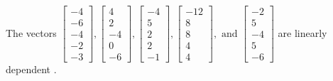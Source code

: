 \begin{exercise}
\begin{exerciseStatement}
  \end{exerciseStatement}
  \begin{exerciseAnswer}
   The vectors \(\left[\begin{array}{r}
-4 \\
-6 \\
-4 \\
-2 \\
-3
\end{array}\right] , \left[\begin{array}{r}
4 \\
2 \\
-4 \\
0 \\
-6
\end{array}\right] , \left[\begin{array}{r}
-4 \\
5 \\
2 \\
2 \\
-1
\end{array}\right] , \left[\begin{array}{r}
-12 \\
8 \\
8 \\
4 \\
4
\end{array}\right] , \text{ and } \left[\begin{array}{r}
-2 \\
5 \\
-4 \\
5 \\
-6
\end{array}\right]\) are 
  	 linearly dependent  .
  


  \end{exerciseAnswer}
\end{exercise}